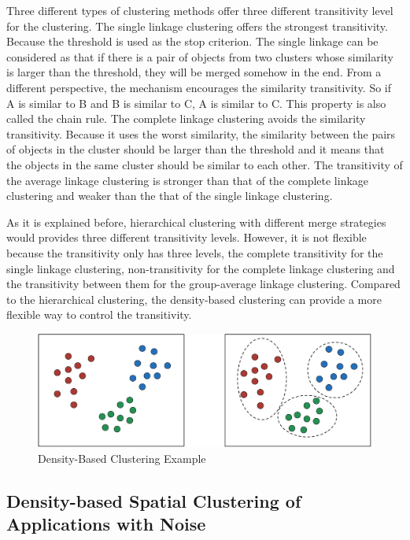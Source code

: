 Three different types of clustering methods offer three different transitivity level for the clustering. The single linkage clustering offers the strongest transitivity. Because the threshold is used as the stop criterion. The single linkage can be considered as that if there is a pair of objects from two clusters whose similarity is larger than the threshold, they will be merged somehow in the end. From a different perspective, the mechanism encourages the similarity transitivity. So if A is similar to B and B is similar to C, A is similar to C. This property is also called the chain rule. The complete linkage clustering avoids the similarity transitivity. Because it uses the worst similarity, the similarity between the pairs of objects in the cluster should be larger than the threshold and it means that the objects in the same cluster should be similar to each other. The transitivity of the average linkage clustering is stronger than that of the complete linkage clustering and weaker than the that of the single linkage clustering. 

As it is explained before, hierarchical clustering with different merge strategies would provides three different transitivity levels. However, it is not flexible because the transitivity only has three levels, the complete transitivity for the single linkage clustering, non-transitivity for the complete linkage clustering and the transitivity between them for the group-average linkage clustering. Compared to the hierarchical clustering, the density-based clustering can provide a more flexible way to control the transitivity. 
\begin{figure}
\centering
\includegraphics[scale=0.3]{density-basedClustering.pdf}
\caption{Density-Based Clustering Example}
\end{figure}



\subsection{Density-based Spatial Clustering of Applications with Noise}

